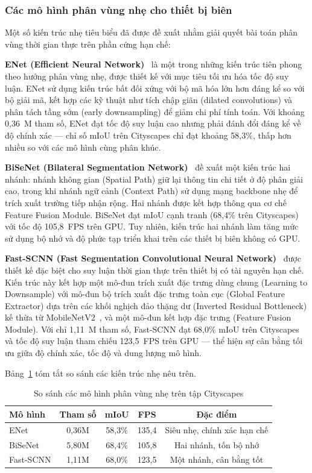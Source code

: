 \documentclass[conference]{IEEEtran}
\begin{document}
\subsubsection{Các mô hình phân vùng nhẹ cho thiết bị biên}

Một số kiến trúc nhẹ tiêu biểu đã được đề xuất nhằm giải quyết bài toán phân vùng thời gian thực trên phần cứng hạn chế:

\textbf{ENet (Efficient Neural Network)}~\cite{enet2016} là một trong những kiến trúc tiên phong theo hướng phân vùng nhẹ, được thiết kế với mục tiêu tối ưu hóa tốc độ suy luận. ENet sử dụng kiến trúc bất đối xứng với bộ mã hóa lớn hơn đáng kể so với bộ giải mã, kết hợp các kỹ thuật như tích chập giãn (dilated convolutions) và phân tách tầng sớm (early downsampling) để giảm chi phí tính toán. Với khoảng 0,36~M tham số, ENet đạt tốc độ suy luận cao nhưng phải đánh đổi đáng kể về độ chính xác --- chỉ số mIoU trên Cityscapes chỉ đạt khoảng 58,3\%, thấp hơn nhiều so với các mô hình cùng phân khúc.

\textbf{BiSeNet (Bilateral Segmentation Network)}~\cite{bisenet2018} đề xuất một kiến trúc hai nhánh: nhánh không gian (Spatial Path) giữ lại thông tin chi tiết ở độ phân giải cao, trong khi nhánh ngữ cảnh (Context Path) sử dụng mạng backbone nhẹ để trích xuất trường tiếp nhận rộng. Hai nhánh được kết hợp thông qua cơ chế Feature Fusion Module. BiSeNet đạt mIoU cạnh tranh (68,4\% trên Cityscapes) với tốc độ 105,8~FPS trên GPU. Tuy nhiên, kiến trúc hai nhánh làm tăng mức sử dụng bộ nhớ và độ phức tạp triển khai trên các thiết bị biên không có GPU.

\textbf{Fast-SCNN (Fast Segmentation Convolutional Neural Network)}~\cite{fastscnn2019} được thiết kế đặc biệt cho suy luận thời gian thực trên thiết bị có tài nguyên hạn chế. Kiến trúc này kết hợp một mô-đun trích xuất đặc trưng dùng chung (Learning to Downsample) với mô-đun bộ trích xuất đặc trưng toàn cục (Global Feature Extractor) dựa trên các khối nghịch đảo thặng dư (Inverted Residual Bottleneck) kế thừa từ MobileNetV2~\cite{mobilenetv22018}, và một mô-đun kết hợp đặc trưng (Feature Fusion Module). Với chỉ 1,11~M tham số, Fast-SCNN đạt 68,0\% mIoU trên Cityscapes và tốc độ suy luận tham chiếu 123,5~FPS trên GPU --- thể hiện sự cân bằng tối ưu giữa độ chính xác, tốc độ và dung lượng mô hình.

Bảng~\ref{tab:compare_models} tóm tắt so sánh các kiến trúc nhẹ nêu trên.

\begin{table}[htbp]
\centering
\caption{So sánh các mô hình phân vùng nhẹ trên tập Cityscapes}
\label{tab:compare_models}
\begin{tabular}{lcccc}
\toprule
\textbf{Mô hình} & \textbf{Tham số} & \textbf{mIoU} & \textbf{FPS} & \textbf{Đặc điểm} \\
\midrule
ENet      & 0,36M  & 58,3\% & 135,4 & Siêu nhẹ, chính xác hạn chế \\
BiSeNet   & 5,80M  & 68,4\% & 105,8 & Hai nhánh, tốn bộ nhớ \\
Fast-SCNN & 1,11M  & 68,0\% & 123,5 & Một nhánh, cân bằng tốt \\
\bottomrule
\end{tabular}
\end{table}
\end{document}
